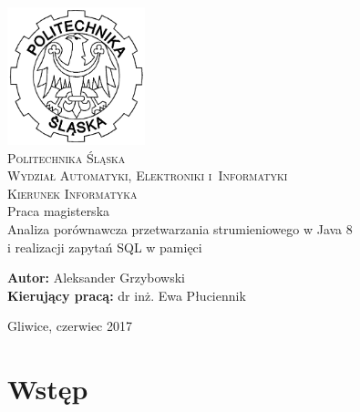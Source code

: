 \documentclass[12pt,twoside,openright]{extarticle}
\begin{document}
\begin{titlepage}
    \begin{center}
        \includegraphics[width=4cm]{polsl.png}\\[1cm]
        \textsc{\LARGE{Politechnika Śląska}}\\[0.5cm]
        \textsc{\LARGE{Wydział Automatyki, Elektroniki i~Informatyki}}\\[0.5cm]
        \textsc{\LARGE{Kierunek Informatyka}}\\[2.5cm]
        \LARGE{Praca magisterska}\\[1cm]
        \begingroup
            \fontsize{14pt}{17pt}\selectfont
            Analiza porównawcza przetwarzania strumieniowego w Java 8 \\ i realizacji zapytań SQL w pamięci
        \endgroup
    \end{center}
    \vspace{2cm}
    \begingroup
        \fontsize{14pt}{17pt}\selectfont
        \textbf{Autor:} Aleksander Grzybowski\\
        \textbf{Kierujący pracą:} dr inż. Ewa Płuciennik\\
    \endgroup

    \vspace{2.0cm}
    \begingroup
        \fontsize{12pt}{14pt}\selectfont
        \begin{center}
        Gliwice, czerwiec 2017
        \end{center}
    \endgroup
\end{titlepage}

\clearpage\mbox{}\clearpage



\clearpage\mbox{}\clearpage

\tableofcontents

\listoffigures

\lstlistoflistings

\listoftables

\cleardoublepage
\section{Wstęp}
\end{document}
